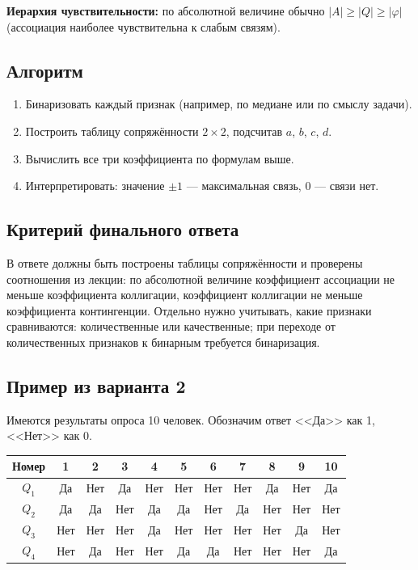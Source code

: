 \textbf{Иерархия чувствительности:} по абсолютной величине обычно $|A| \ge |Q| \ge |\varphi|$ (ассоциация наиболее чувствительна к слабым связям).

\subsection*{Алгоритм}

\begin{enumerate}
  \item Бинаризовать каждый признак (например, по медиане или по смыслу задачи).
  \item Построить таблицу сопряжённости $2\times 2$, подсчитав $a$, $b$, $c$, $d$.
  \item Вычислить все три коэффициента по формулам выше.
  \item Интерпретировать: значение $\pm1$ — максимальная связь, $0$ — связи нет.
\end{enumerate}

\subsection*{Критерий финального ответа}

В ответе должны быть построены таблицы сопряжённости и проверены соотношения из лекции: по абсолютной величине коэффициент ассоциации не меньше коэффициента коллигации, коэффициент коллигации не меньше коэффициента контингенции. Отдельно нужно учитывать, какие признаки сравниваются: количественные или качественные; при переходе от количественных признаков к бинарным требуется бинаризация.

\subsection*{Пример из варианта 2}

Имеются результаты опроса 10 человек. Обозначим ответ <<Да>> как 1, <<Нет>> как 0.

\begin{center}
\small
\begin{tabular}{c|cccccccccc}
  \hline
  Номер & 1 & 2 & 3 & 4 & 5 & 6 & 7 & 8 & 9 & 10 \\
  \hline
  $Q_1$ & Да & Нет & Да & Нет & Нет & Нет & Нет & Да & Нет & Да \\
  $Q_2$ & Да & Да & Нет & Да & Да & Нет & Да & Нет & Нет & Нет \\
  $Q_3$ & Нет & Нет & Нет & Да & Нет & Нет & Нет & Нет & Да & Нет \\
  $Q_4$ & Нет & Да & Нет & Нет & Да & Да & Нет & Нет & Нет & Да \\
  \hline
\end{tabular}
\end{center}

